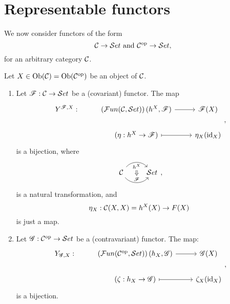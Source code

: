 \section{Representable functors}
We now consider functors of the form
\[
\mathcal{C} \to \mathcal{S}et\text{ and }\mathcal{C}^{\mathrm{op}}\to \mathcal{S}et,
\]
for an arbitrary category $\mathcal{C}$.
\begin{lem}
  Let $X\in \text{Ob}(\mathcal{C}) = \text{Ob}(\mathcal{C}^{\mathrm{op}})$ be an object of $\mathcal{C}$.
  \begin{enumerate}
    \item Let $\mathscr{F}: \mathcal{C} \to \mathcal{S}et$ be a (covariant) functor. The map
    \[
      \begin{tikzcd}Y^{\ffunc,X}:&\left(\fnc(\ccat,\stc)\right)(h^X,\ffunc)\ar{r}&\ffunc(X)\\
      &(\eta:h^X\to \ffunc)\ar[mapsto]{r}&\eta_X(\id_X)\end{tikzcd},
  \]
  is a bijection,
  where
  \[
  \begin{tikzcd}
  \ccat \arrow[r, bend left=50, "h^X"{name=U, below}]
  \arrow[r, bend right=50, "\ffunc"{name=D}]
  &\stc
  \arrow[Rightarrow, from=U, to=D] \end{tikzcd},
  \]
  is a natural transformation, and
  \[
  \eta_X: \mathcal{C}(X,X)=h^X(X)\to F(X)
\]
  is just a map.
  \item Let $\mathscr{G}:\mathcal{C}^{\mathrm{op}}\to \mathcal{S}et$ be a (contravariant) functor. The map:
  \[
    \begin{tikzcd}Y_{\gfunc,X}:&\left(\fnc(\op{\ccat},\stc)\right)(h_X,\gfunc)\ar{r}&\gfunc(X)\\
    &(\zeta:h_X\to \gfunc)\ar[mapsto]{r}&\zeta_X(\id_X)\end{tikzcd},
\]
  is a bijection.
\end{enumerate}
\end{lem}
